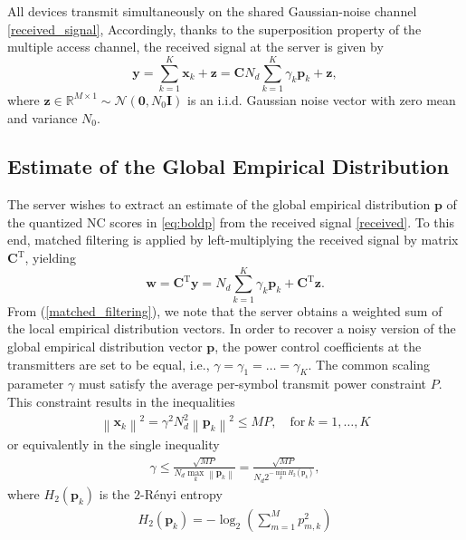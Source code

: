 \documentclass[12pt, draftclsnofoot, onecolumn]{IEEEtran}
\begin{document}
All devices transmit simultaneously on the shared Gaussian-noise channel \eqref{received_signal}, Accordingly, thanks to the superposition property of the multiple access channel, the received signal at the server is given by
\begin{equation}\label{received}
    \boldsymbol{y}= \sum_{k=1}^K \boldsymbol{x}_k+ \boldsymbol{z}=\boldsymbol{C}N_d\sum_{k=1}^K\gamma_k\boldsymbol{p}_k + \boldsymbol{z} ,
\end{equation}
where $\boldsymbol{z}\in\mathbb{R}^{M\times 1} \sim  \mathcal{N}(\boldsymbol{0}, N_0 \mathbf{I})$ is an i.i.d. Gaussian noise vector with zero mean and variance $N_0$. 

\subsection{Estimate of the Global Empirical Distribution}\label{P_usage}
The server wishes to extract an estimate of the global empirical distribution $\boldsymbol{p}$ of the quantized NC scores in \eqref{eq:boldp} from the received signal \eqref{received}. To this end, matched filtering is applied by left-multiplying the received signal by matrix $\boldsymbol{C}^{\mathrm{T}}$, yielding
\begin{equation}\label{matched_filtering}
    \boldsymbol{w} = \boldsymbol{C}^{\mathrm{T}}\boldsymbol{y} = N_d\sum_{k=1}^K\gamma_k\boldsymbol{p}_k + \boldsymbol{C}^{\mathrm{T}}\boldsymbol{z}.
\end{equation}
From (\ref{matched_filtering}), we note that the server obtains a weighted sum of the local empirical distribution vectors. In order to recover a noisy version of the global empirical distribution vector $\boldsymbol{p}$, the power control coefficients at the transmitters are set to be equal, i.e., $\gamma=\gamma_1=\dots=\gamma_K$. The common scaling parameter $\gamma$ must satisfy the average per-symbol transmit power constraint $P$. This constraint  results in the inequalities
\begin{align}\label{P_constraint}
    \left\| \boldsymbol{x}_k\right\| ^2 = \gamma^2N_d^2\left\| {\boldsymbol{p}}_k\right\| ^2 \leq MP,\quad \text{for}~ k=1,\dots,K
\end{align}
or equivalently in the single inequality
\begin{align}\label{G_ineq}
    \gamma\leq \frac{\sqrt{MP}}{N_d\max_k\left\| {\boldsymbol{p}}_k\right\|}=\frac{\sqrt{MP}}{N_d 2^{-\min_k H_2({\boldsymbol{p}}_k)}},
\end{align}
where $H_2(\boldsymbol{p}_k)$ is the $2$-Rényi entropy \cite{renyi1961measures}\begin{align}
    H_2(\boldsymbol{p}_k)=-\log_2\left(\sum_{m=1}^{M}p_{m,k}^2\right)
\end{align}
\end{document}
